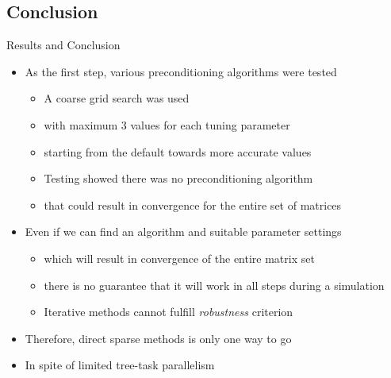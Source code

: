 \subsection{Conclusion}

\begin{frame}[t]{Results and Conclusion}
    \small
    \justifying
    
    \begin{itemize}
	    \item As the first step, various preconditioning algorithms were tested
	    \begin{itemize}
	    	\setlength\itemsep{1mm}
	    	
	    	\item A coarse grid search was used
	    	
	    	\item with maximum 3 values for each tuning parameter 
	    	
	    	\item starting from the default towards more accurate values 
	    	
	    	\item Testing showed there was no preconditioning algorithm 
	    	
	    	\item that could result in convergence for the entire set of matrices 
	    \end{itemize}

	\item Even if we can find an algorithm and suitable parameter settings
	\begin{itemize}
		\setlength\itemsep{1mm}
		
		\item which will result in convergence of the entire matrix set
		
		\item there is no guarantee that it will work in all steps during a simulation
		
		\item Iterative methods cannot fulfill \textit{robustness} criterion
	
	\end{itemize}

	\item Therefore, direct sparse methods is only one way to go
	
	\item In spite of limited tree-task parallelism
\end{itemize}
	 
\end{frame}

